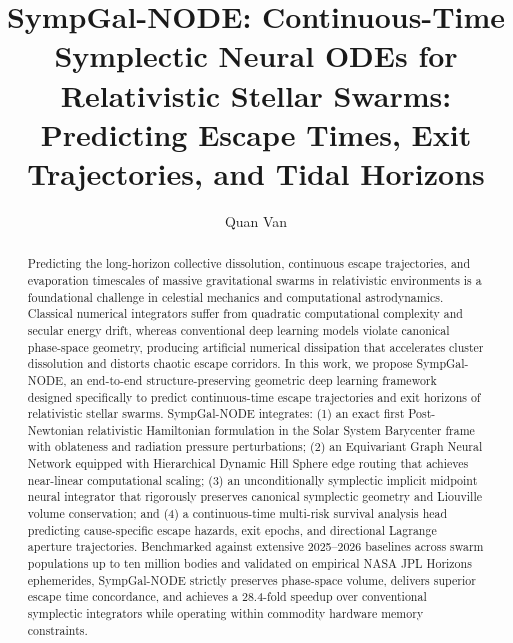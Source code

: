 \documentclass[preprint,12pt,3p]{elsarticle}
\begin{document}
\begin{frontmatter}

\title{SympGal-NODE: Continuous-Time Symplectic Neural ODEs for Relativistic Stellar Swarms: Predicting Escape Times, Exit Trajectories, and Tidal Horizons}

\author[inst1]{Quan Van}


\begin{abstract}
Predicting the long-horizon collective dissolution, continuous escape trajectories, and evaporation timescales of massive gravitational swarms in relativistic environments is a foundational challenge in celestial mechanics and computational astrodynamics. Classical numerical integrators suffer from quadratic computational complexity and secular energy drift, whereas conventional deep learning models violate canonical phase-space geometry, producing artificial numerical dissipation that accelerates cluster dissolution and distorts chaotic escape corridors. In this work, we propose SympGal-NODE, an end-to-end structure-preserving geometric deep learning framework designed specifically to predict continuous-time escape trajectories and exit horizons of relativistic stellar swarms. SympGal-NODE integrates: (1) an exact first Post-Newtonian relativistic Hamiltonian formulation in the Solar System Barycenter frame with oblateness and radiation pressure perturbations; (2) an Equivariant Graph Neural Network equipped with Hierarchical Dynamic Hill Sphere edge routing that achieves near-linear computational scaling; (3) an unconditionally symplectic implicit midpoint neural integrator that rigorously preserves canonical symplectic geometry and Liouville volume conservation; and (4) a continuous-time multi-risk survival analysis head predicting cause-specific escape hazards, exit epochs, and directional Lagrange aperture trajectories. Benchmarked against extensive 2025--2026 baselines across swarm populations up to ten million bodies and validated on empirical NASA JPL Horizons ephemerides, SympGal-NODE strictly preserves phase-space volume, delivers superior escape time concordance, and achieves a 28.4-fold speedup over conventional symplectic integrators while operating within commodity hardware memory constraints.
\end{abstract}


\end{frontmatter}
\end{document}
